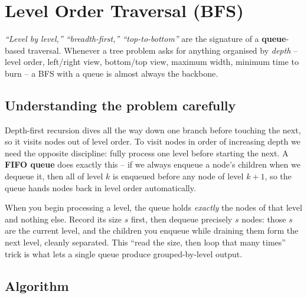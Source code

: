 \section{Level Order Traversal (BFS)}
\label{sec:trees-level-order}


\begin{patternbox}
\emph{``Level by level,'' ``breadth-first,'' ``top-to-bottom''} are the
signature of a \textbf{queue}-based traversal. Whenever a tree problem
asks for anything organised by \emph{depth} -- level order, left/right
view, bottom/top view, maximum width, minimum time to burn -- a BFS with a
queue is almost always the backbone.
\end{patternbox}

\subsection*{Understanding the problem carefully}

Depth-first recursion dives all the way down one branch before touching
the next, so it visits nodes out of level order. To visit nodes in order
of increasing depth we need the opposite discipline: fully process one
level before starting the next. A \textbf{FIFO queue} does exactly this --
if we always enqueue a node's children when we dequeue it, then all of
level $k$ is enqueued before any node of level $k+1$, so the queue hands
nodes back in level order automatically.

\begin{ideabox}
When you begin processing a level, the queue holds \emph{exactly} the
nodes of that level and nothing else. Record its size $s$ first, then
dequeue precisely $s$ nodes: those $s$ are the current level, and the
children you enqueue while draining them form the next level, cleanly
separated. This ``read the size, then loop that many times'' trick is what
lets a single queue produce grouped-by-level output.
\end{ideabox}

\subsection*{Algorithm}

